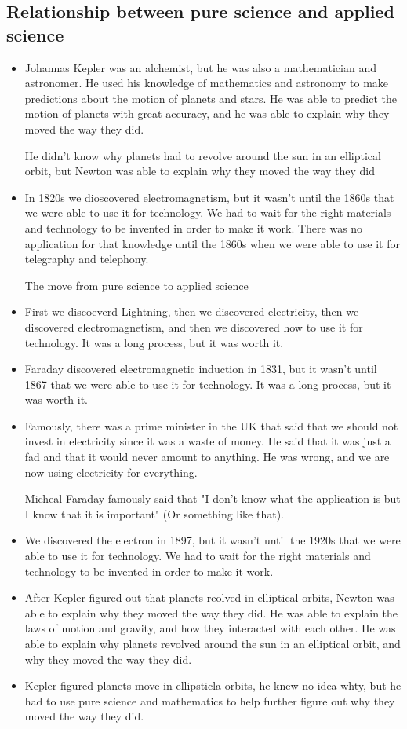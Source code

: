 \documentclass{article}
\begin{document}
\subsection{Relationship between pure science and applied science}
\begin{itemize}
  \item Johannas Kepler was an alchemist, but he was also a mathematician
    and astronomer. He used his knowledge of mathematics and astronomy
    to make predictions about the motion of planets and stars.
    He was able to predict the motion of planets with great accuracy,
    and he was able to explain why they moved the way they did.

    He didn't know why planets had to revolve around the sun in an elliptical orbit,
    but Newton was able to explain why they moved the way they did

  \item In 1820s we dioscovered electromagnetism, but it wasn't until the 1860s
    that we were able to use it for technology.
    We had to wait for the right materials and technology to be invented
    in order to make it work. There was no application for that knowledge
    until the 1860s when we were able to use it for telegraphy and telephony.

    The move from pure science to applied science
  \item First we discoeverd Lightning, then we discovered electricity,
    then we discovered electromagnetism, and then we discovered how to use it
    for technology. It was a long process, but it was worth it.
  \item Faraday discovered electromagnetic induction in 1831,
    but it wasn't until 1867 that we were able to use it for technology.
    It was a long process, but it was worth it.
  \item Famously, there was a prime minister in the UK
    that said that we should not invest in electricity since it was a waste of money.
    He said that it was just a fad and that it would never amount to anything.
    He was wrong, and we are now using electricity for everything.

    Micheal Faraday famously said that "I don't know what the application is but I know that it is important"
    (Or something like that).
  \item We discovered the electron in 1897, but it wasn't until the 1920s
    that we were able to use it for technology. We had to wait for the right materials
    and technology to be invented in order to make it work.
  \item After Kepler figured out that planets reolved in elliptical orbits,
    Newton was able to explain why they moved the way they did.
    He was able to explain the laws of motion and gravity, and how they
    interacted with each other. He was able to explain why planets
    revolved around the sun in an elliptical orbit, and why they moved
    the way they did.
  \item Kepler figured planets move in ellipsticla orbits,
    he knew no idea whty, but he had to use pure science and mathematics
    to help further figure out why they moved the way they did.
\end{itemize}
\end{document}
